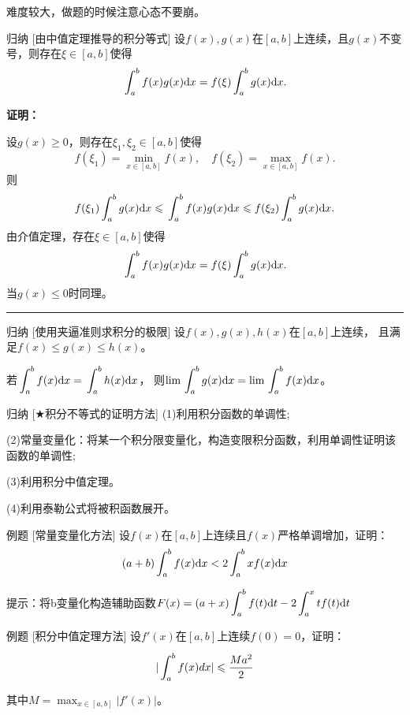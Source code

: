 \documentclass[a4paper,12pt,oneside,fontset=none]{ctexbook}
\renewcommand{\leq}{\leqslant}
\let\olddfrac\dfrac
\renewcommand{\dfrac}[2]{
    \olddfrac{#1\vrule width 0pt height 1.15em depth 0em}{#2\vrule width 0pt height 0em depth 0.6em}
}
\let\oldlim\lim
\renewcommand{\lim}{\displaystyle\oldlim}
\let\oldint\int
\renewcommand{\int}{\displaystyle{\vrule width 0pt height 0em depth 0em}\oldint}
\newenvironment{induction}[1][]{\begin{thmBox}{归纳}{#1}}{\end{thmBox}}
\newcounter{example}[chapter]
\newenvironment{example}[1][]{\begin{exBox}{例题}{#1}}{\end{exBox}}
\renewenvironment{proof}{
    \par\vspace{0.5em}\noindent
    \textbf{\color{LogicColor} 证明：}
}{
    \hfill \textcolor{LogicColor}{\rule{0.6em}{0.6em}} \par
}
\numberwithin{equation}{chapter}
\begin{document}
难度较大，做题的时候注意心态不要崩。


\begin{induction}
    [由中值定理推导的积分等式]
    设$f(x),g(x)$在$[a,b]$上连续，且$g(x)$不变号，则存在$\xi\in[a,b]$使得
    \[
        \int_a^b f(x)g(x)\mathrm{d}x = f(\xi)\int_a^b g(x)\mathrm{d}x.
    \]
\end{induction}
\begin{proof}
    设$g(x)\geqslant 0$，则存在$\xi_1,\xi_2\in[a,b]$使得
    \[
        f(\xi_1) = \min_{x\in[a,b]}f(x),\quad f(\xi_2) = \max_{x\in[a,b]}f(x).
    \]
    则
    \[
        f(\xi_1)\int_a^b g(x)\mathrm{d}x \leqslant \int_a^b f(x)g(x)\mathrm{d}x \leqslant f(\xi_2)\int_a^b g(x)\mathrm{d}x.
    \]
    由介值定理，存在$\xi\in[a,b]$使得
    \[
        \int_a^b f(x)g(x)\mathrm{d}x = f(\xi)\int_a^b g(x)\mathrm{d}x.
    \]
    当$g(x)\leqslant 0$时同理。
\end{proof}

\begin{induction}
    [使用夹逼准则求积分的极限]
    设$f(x),g(x),h(x)$在$[a,b]$上连续，
    且满足$f(x)\leqslant g(x)\leqslant h(x)$。

    若$\int_a^b f(x)\mathrm{d}x = \int_a^b h(x)\mathrm{d}x$，
    则$\lim\int_a^b g(x)\mathrm{d}x = \lim \int_a^b f(x)\mathrm{d}x$。
\end{induction}

\begin{induction}
    [$\bigstar$积分不等式的证明方法]
    (1)利用积分函数的单调性;
    
    (2)常量变量化：将某一个积分限变量化，构造变限积分函数，利用单调性证明该函数的单调性;
    
    (3)利用积分中值定理。    
    
    (4)利用泰勒公式将被积函数展开。
\end{induction}

\begin{example}
    [常量变量化方法]
    设$f(x)$在$[a,b]$上连续且$f(x)$严格单调增加，证明：
    $$(a+b)\int_{a}^{b}f(x)\mathrm{d}x < 2\int_{a}^{b}xf(x)\mathrm{d}x\mathstrut$$

    提示：将b变量化构造辅助函数$F(x)=(a+x)\int_{a}^{b}f(t)\mathrm{d}t - 2\int_{a}^{x}tf(t)\mathrm{d}t$
\end{example}

\begin{example}
    [积分中值定理方法]
    设$f'(x)$在$[a,b]$上连续$f(0)=0$，证明：
    $$|\int_{a}^{b}f(x)dx| \leq \dfrac{Ma^2}{2}$$
    其中$M=\max_{x\in[a,b]}|f'(x)|$。
\end{example}
\end{document}
